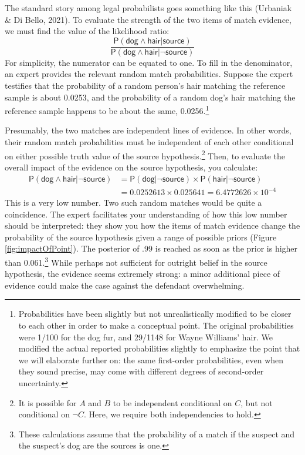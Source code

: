 \documentclass[
  10pt,
  dvipsnames,enabledeprecatedfontcommands]{scrartcl}
\newcommand{\pr}[1]{\mathsf{P}(#1)}
\newcommand{\s}[1]{\mbox{$\mathsf{#1}$}}
\begin{document}
The standard story among legal probabilists goes something like this
(Urbaniak \& Di Bello, 2021). To evaluate the strength of the two items
of match evidence, we must find the value of the likelihood ratio:
\[\frac{\pr{\s{dog}\wedge \s{hair} \vert \s{source}}}{\pr{\s{dog}\wedge \s{hair} \vert \neg \s{source}}}\]
For simplicity, the numerator can be equated to one. To fill in the
denominator, an expert provides the relevant random match probabilities.
Suppose the expert testifies that the probability of a random person's
hair matching the reference sample is about 0.0253, and the probability
of a random dog's hair matching the reference sample happens to be about
the same, 0.0256.\footnote{Probabilities have been slightly but not
  unrealistically modified to be closer to each other in order to make a
  conceptual point. The original probabilities were 1/100 for the dog
  fur, and 29/1148 for Wayne Williams' hair. We modified the actual
  reported probabilities slightly to emphasize the point that we will
  elaborate further on: the same first-order probabilities, even when
  they sound precise, may come with different degrees of second-order
  uncertainty.}

Presumably, the two matches are independent lines of evidence. In other
words, their random match probabilities must be independent of each
other conditional on either possible truth value of the source
hypothesis.\footnote{It is possible for \(A\) and \(B\) to be
  independent conditional on \(C\), but not conditional on \(\neg C\).
  Here, we require both independencies to hold.} Then, to evaluate the
overall impact of the evidence on the source hypothesis, you calculate:
\begin{align*}
\pr{\s{dog}\wedge \s{hair} \vert \neg \s{source}} & = \pr{\s{dog} \vert \neg \s{source}} 
\times \pr{\s{hair} \vert \neg \s{source}} \\
& =  0.0252613 \times  0.025641 = \ensuremath{6.4772626\times 10^{-4}}
\end{align*} This is a very low number. Two such random matches would be
quite a coincidence. The expert facilitates your understanding of how
this low number should be interpreted: they show you how the items of
match evidence change the probability of the source hypothesis given a
range of possible priors (Figure \ref{fig:impactOfPoint}). The posterior
of .99 is reached as soon as the prior is higher than 0.061.\footnote{These
  calculations assume that the probability of a match if the suspect and
  the suspect's dog are the sources is one.} While perhaps not
sufficient for outright belief in the source hypothesis, the evidence
seems extremely strong: a minor additional piece of evidence could make
the case against the defendant overwhelming.
\end{document}
